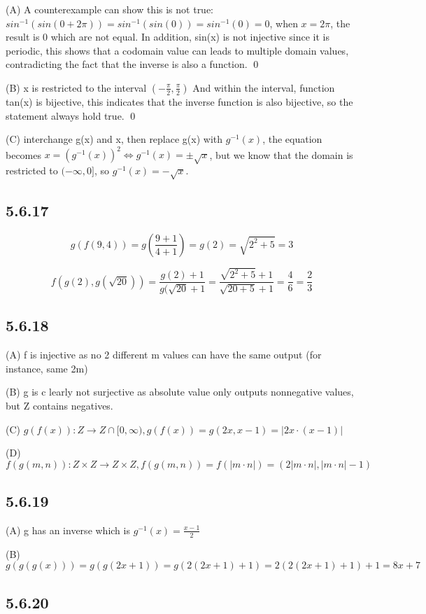 \documentclass{article}
\begin{document}
(A) A counterexample can show this is not true: $sin^{-1}(sin(0+2\pi))=sin^{-1}(sin(0))=sin^{-1}(0)=0$, when $x=2\pi$, the result is 0 which are not equal. In addition, sin(x) is not injective since it is periodic, this shows that a codomain value can leads to multiple domain values, contradicting the fact that the inverse is also a function. \qed

(B) x is restricted to the interval $\left(-\frac{\pi}{2},\frac{\pi}{2}\right)$ And within the interval, function tan(x) is bijective, this indicates that the inverse function is also bijective, so the statement always hold true. \qed

(C) interchange g(x) and x, then replace g(x) with $g^{-1}(x)$, the equation becomes $x=(g^{-1}(x))^2 \iff g^{-1}(x)=\pm \sqrt{x}$, but we know that the domain is restricted to $(-\infty,0]$, so $g^{-1}(x)=-\sqrt{x}$. 

\subsection*{5.6.17}

$$g(f(9,4))=g(\frac{9+1}{4+1})=g(2)=\sqrt{2^2+5}=3$$

$$f(g(2),g(\sqrt{20}))=\frac{g(2)+1}{g(\sqrt{20}+1}=\frac{\sqrt{2^2+5}+1}{\sqrt{20+5}+1}=\frac{4}{6}=\frac{2}{3}$$

\subsection*{5.6.18}

(A) f is injective as no 2 different m values can have the same output (for instance, same 2m)

(B) g is c learly not surjective as absolute value only outputs nonnegative values, but Z contains negatives.

(C) $g(f(x)): Z \rightarrow Z\cap[0,\infty), g(f(x))=g(2x,x-1)=|2x\cdot (x-1)|$

(D) $f(g(m,n)): Z\times Z \rightarrow Z\times Z, f(g(m,n))=f(|m\cdot n|)=(2|m\cdot n|,|m\cdot n|-1)$

\subsection*{5.6.19}

(A) g has an inverse which is $g^{-1}(x)=\frac{x-1}{2}$

(B) $$g(g(g(x)))=g(g(2x+1))=g(2(2x+1)+1)=2(2(2x+1)+1)+1=8x+7$$

\subsection*{5.6.20}
\end{document}

